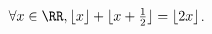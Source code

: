 %
%
	\begin{tasks}
		\task \Mq $\forall x \in \RR, \lfloor x \rfloor + \lfloor x + \frac{1}{2} \rfloor = \lfloor 2 x \rfloor$.
	\end{tasks}
